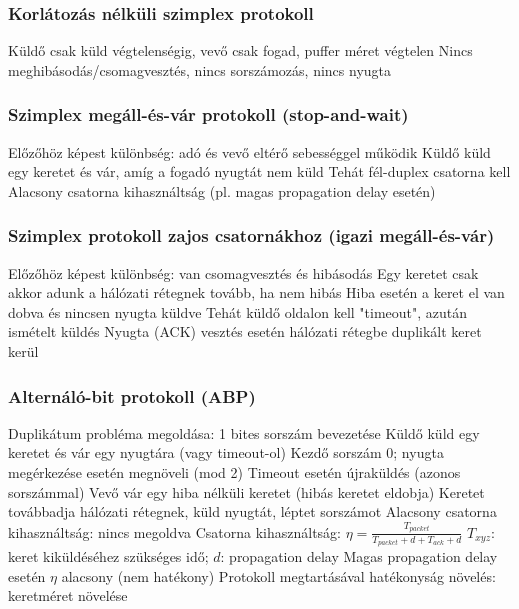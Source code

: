 \documentclass[12pt,a4paper]{article}
\begin{document}
\subsubsection{Korlátozás nélküli szimplex protokoll}

\begin{outline}
	\1 Küldő csak küld végtelenségig, vevő csak fogad, puffer méret végtelen
	\1 Nincs meghibásodás/csomagvesztés, nincs sorszámozás, nincs nyugta
\end{outline}

\subsubsection{Szimplex megáll-és-vár protokoll (stop-and-wait)}

\begin{outline}
	\1 Előzőhöz képest különbség: adó és vevő eltérő sebességgel működik
	\1 Küldő küld egy keretet és vár, amíg a fogadó nyugtát nem küld
		\2 Tehát fél-duplex csatorna kell
	\1 Alacsony csatorna kihasználtság (pl. magas propagation delay esetén)
\end{outline}

\subsubsection{Szimplex protokoll zajos csatornákhoz (igazi megáll-és-vár)}

\begin{outline}
	\1 Előzőhöz képest különbség: van csomagvesztés és hibásodás
	\1 Egy keretet csak akkor adunk a hálózati rétegnek tovább, ha nem hibás
		\2 Hiba esetén a keret el van dobva és nincsen nyugta küldve
		\2 Tehát küldő oldalon kell "timeout", azután ismételt küldés
	\1 Nyugta (ACK) vesztés esetén hálózati rétegbe duplikált keret kerül
\end{outline}

\subsubsection{Alternáló-bit protokoll (ABP)}

\begin{outline}
	\1 Duplikátum probléma megoldása: 1 bites sorszám bevezetése
	\1 Küldő küld egy keretet és vár egy nyugtára (vagy timeout-ol)
		\2 Kezdő sorszám 0; nyugta megérkezése esetén megnöveli (mod 2)
		\2 Timeout esetén újraküldés (azonos sorszámmal)
	\1 Vevő vár egy hiba nélküli keretet (hibás keretet eldobja)
		\2 Keretet továbbadja hálózati rétegnek, küld nyugtát, léptet sorszámot
	\1 Alacsony csatorna kihasználtság: nincs megoldva
		\2 Csatorna kihasználtság: $\eta = \frac{T_{packet}}{T_{packet} + d + T_{ack} + d}$
			\3 $T_{xyz}$: keret kiküldéséhez szükséges idő; $d$: propagation delay
		\2 Magas propagation delay esetén $\eta$ alacsony (nem hatékony)
		\2 Protokoll megtartásával hatékonyság növelés: keretméret növelése
\end{outline}
\end{document}
